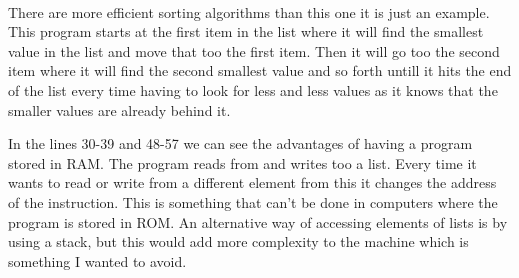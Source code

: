 \documentclass{article}
\begin{document}
~\\
There are more efficient sorting algorithms than this one it is just an example. This program starts at the first item in the list where it will find the smallest value in the list and move that too the first item. Then it will go too the second item where it will find the second smallest value and so forth untill it hits the end of the list every time having to look for less and less values as it knows that the smaller values are already behind it.

In the lines 30-39 and 48-57 we can see the advantages of having a program stored in RAM. The program reads from and writes too a list. Every time it wants to read or write from a different element from this it changes the address of the instruction. This is something that can't be done in computers where the program is stored in ROM. An alternative way of accessing elements of lists is by using a stack, but this would add more complexity to the machine which is something I wanted to avoid.

%


%

%
\end{document}
